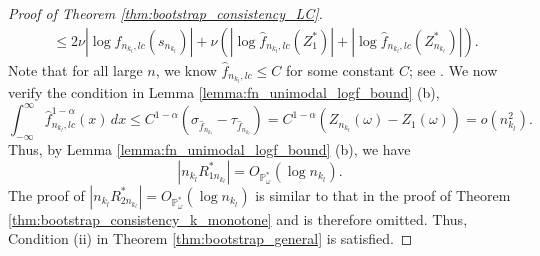 \documentclass[12pt,letterpaper, twoside, openany]{article}
\theoremstyle{plain}
\begin{document}
\begin{proof}[Proof of Theorem \ref{thm:bootstrap_consistency_LC}]
\begin{align*}
    & \leq 2 \nu |\log f_{n_{k_l},lc}(s_{n_{k_l}})| + \nu (| \log \hat{f}_{n_{k_l},lc}(Z^*_1)| + 
   | \log \hat{f}_{n_{k_l},lc}(Z^*_{n_{k_l}})|).
\end{align*}
Note that for all large $n$, we know $\hat{f}_{n_{k_l},lc} \leq C$ for some constant $C$; see \cite{cule2010theoretical}. We now verify the condition in Lemma \ref{lemma:fn_unimodal_logf_bound} (b), 
\begin{equation*}
	\int^\infty_{-\infty} \hat{f}_{n_{k_l},lc}^{1-\alpha}(x) \, dx \leq C^{1-\alpha} (\sigma_{\hat{f}_{n_{k_l}}} - \tau_{\hat{f}_{n_{k_l}}}) = C^{1-\alpha}(Z_{n_{k_l}}(\omega) - Z_1(\omega)) = o(n^2_{k_l}).
\end{equation*}
Thus, by Lemma  \ref{lemma:fn_unimodal_logf_bound} (b), we have
\begin{equation*}
|n_{k_l} R_{1n_{k_l}}^*| = O_{\mathbb{P}^*_\omega}(\log n_{k_l}).
\end{equation*}
The proof of $|n_{k_l} R_{2n_{k_l}}^*| = O_{\mathbb{P}^*_\omega}(\log n_{k_l})$ is similar to that in the proof of Theorem \ref{thm:bootstrap_consistency_k_monotone} and is therefore omitted. Thus, Condition (ii) in Theorem \ref{thm:bootstrap_general} is satisfied.
\end{proof}
\end{document}
